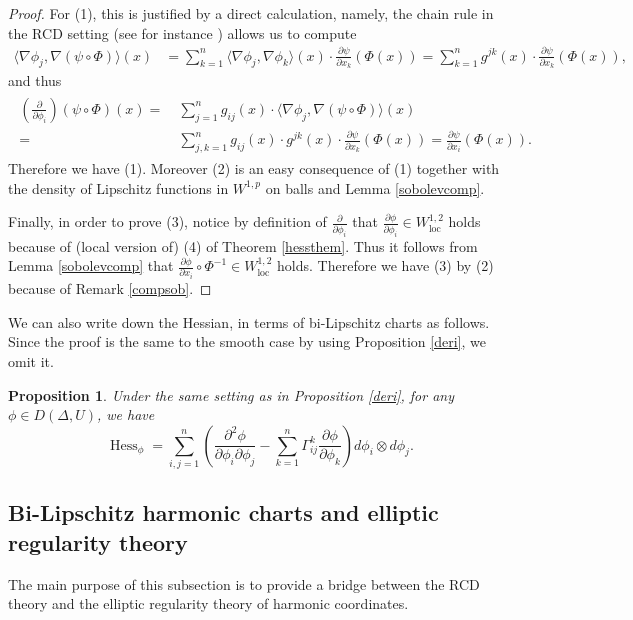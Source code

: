 \documentclass[11pt,reqno]{amsart}
\newtheorem{proposition}[theorem]{Proposition}
\theoremstyle{definition}
\numberwithin{equation}{section}
\DeclareMathOperator{\Hess}{Hess}
\DeclareMathOperator{\loc}{loc}
\begin{document}
\begin{proof}
For (1), this is justified by a direct calculation, namely, the chain rule in the RCD setting (see for instance \cite{AGSrcd, AGSR, AGScalc, Gigli, Gigli1, GP2}) allows us to compute
\begin{align}
\langle \nabla \phi_j, \nabla (\psi \circ \Phi)\rangle (x)&=\sum_{k=1}^n\langle \nabla \phi_j, \nabla \phi_k\rangle(x) \cdot \frac{\partial \psi}{\partial x_k}(\Phi(x)) =\sum_{k=1}^ng^{jk}(x) \cdot  \frac{\partial \psi}{\partial x_k}(\Phi(x)), 
\end{align}
and thus
\begin{align}\begin{split}
\left(\frac{\partial}{\partial \phi_i} \right)(\psi \circ \Phi)(x)= & \ \sum_{j=1}^ng_{ij}(x)\cdot \langle \nabla \phi_j, \nabla (\psi \circ \Phi)\rangle (x) \\
= & \ \sum_{j, k=1}^ng_{i j}(x)\cdot g^{j k}(x)  \cdot \frac{\partial \psi}{\partial x_k}(\Phi(x)) =\frac{\partial \psi}{\partial x_i}(\Phi(x)).
\end{split}
\end{align}
Therefore we have (1). Moreover (2) is an easy consequence of (1) together with the density of Lipschitz functions in $W^{1, p}$ on balls and  Lemma \ref{sobolevcomp}. 

Finally, in order to prove (3), notice by definition of $\frac{\partial}{\partial \phi_i}$ that $\frac{\partial \phi}{\partial \phi_i} \in W^{1,2}_{\loc}$ holds because of (local version of) (4) of Theorem \ref{hessthem}. Thus it follows from Lemma \ref{sobolevcomp} that $\frac{\partial \phi}{\partial x_i} \circ \Phi^{-1} \in W^{1,2}_{\loc}$ holds.  Therefore we have (3) by (2) because of Remark \ref{compsob}. 
\end{proof}
We can also write down the Hessian, in terms of bi-Lipschitz charts as follows.
Since the proof is the same to the smooth case by using Proposition \ref{deri}, we omit it.
\begin{proposition}\label{chrhess}
Under the same setting as in Proposition \ref{deri},
for any $\phi \in D(\Delta, U)$, we have 
\begin{equation}
\Hess_{\phi}=\sum_{i, j=1}^n\left(\frac{\partial^2 \phi}{\partial \phi_i \partial \phi_j}-\sum_{k=1}^n\Gamma^k_{ij}\frac{\partial \phi}{\partial \phi_k} \right)d \phi_i \otimes d \phi_j.
\end{equation}
\end{proposition}

\subsection{Bi-Lipschitz harmonic charts and elliptic regularity theory}\label{harmoniccchas}
The main purpose of this subsection is to provide a bridge between the RCD theory and the elliptic regularity theory of harmonic coordinates.
\end{document}
